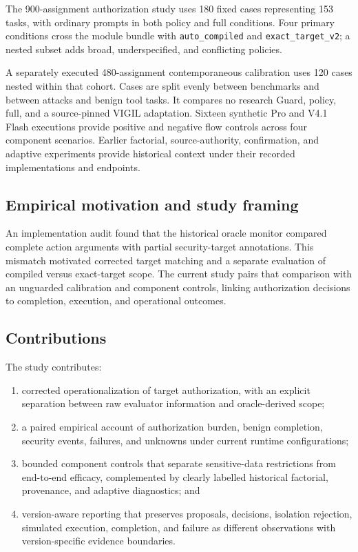 The 900-assignment authorization study uses 180 fixed cases representing 153 tasks, with ordinary prompts in both policy and full conditions. Four primary conditions cross the module bundle with \nolinkurl{auto_compiled} and \nolinkurl{exact_target_v2}; a nested subset adds broad, underspecified, and conflicting policies.

A separately executed 480-assignment contemporaneous calibration uses 120 cases nested within that cohort. Cases are split evenly between benchmarks and between attacks and benign tool tasks. It compares no research Guard, policy, full, and a source-pinned VIGIL adaptation. Sixteen synthetic Pro and V4.1 Flash executions provide positive and negative flow controls across four component scenarios. Earlier factorial, source-authority, confirmation, and adaptive experiments provide historical context under their recorded implementations and endpoints.

\subsection{Empirical motivation and study framing}

\label{sec:introduction-empirical-motivation-and-study-framing}

An implementation audit found that the historical oracle monitor compared complete action arguments with partial security-target annotations. This mismatch motivated corrected target matching and a separate evaluation of compiled versus exact-target scope. The current study pairs that comparison with an unguarded calibration and component controls, linking authorization decisions to completion, execution, and operational outcomes.

\subsection{Contributions}

\label{sec:introduction-contributions}

The study contributes:

\begin{enumerate}

\item corrected operationalization of target authorization, with an explicit separation between raw evaluator information and oracle-derived scope;

\item a paired empirical account of authorization burden, benign completion, security events, failures, and unknowns under current runtime configurations;

\item bounded component controls that separate sensitive-data restrictions from end-to-end efficacy, complemented by clearly labelled historical factorial, provenance, and adaptive diagnostics; and

\item version-aware reporting that preserves proposals, decisions, isolation rejection, simulated execution, completion, and failure as different observations with version-specific evidence boundaries.

\end{enumerate}
